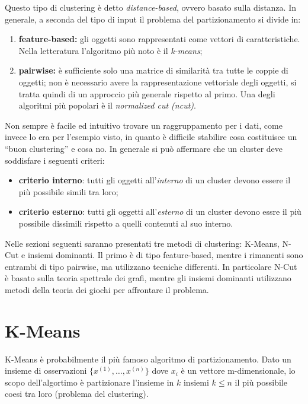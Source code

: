 \newpage

Questo tipo di clustering è detto \emph{distance-based}, ovvero basato sulla distanza. In generale, a seconda del tipo di input il problema del partizionamento si divide in:
\begin{enumerate}
	\item \textbf{feature-based:} gli oggetti sono rappresentati come vettori di caratteristiche. Nella letteratura l'algoritmo più noto è il \emph{k-means};
	\item \textbf{pairwise:} è sufficiente solo una matrice di similarità tra tutte le coppie di oggetti; non è necessario avere la rappresentazione vettoriale degli oggetti, si tratta quindi di un approccio più generale rispetto al primo. Una degli algoritmi più popolari è il \emph{normalized cut (ncut)}. 
\end{enumerate}

Non sempre è facile ed intuitivo trovare un raggruppamento per i dati, come invece lo era per l’esempio visto, in quanto è difficile stabilire cosa costituisce un “buon clustering” e cosa no. In generale si può affermare che un cluster deve soddisfare i seguenti criteri:
\begin{itemize}
	\item \textbf{criterio interno}: tutti gli oggetti all'\emph{interno} di un cluster devono essere il più possibile simili tra loro;
	\item \textbf{criterio esterno}: tutti gli oggetti all'\emph{esterno} di un cluster devono essre il più possibile dissimili rispetto a quelli contenuti al suo interno.
\end{itemize}

Nelle sezioni seguenti saranno presentati tre metodi di clustering:  K-Means, N-Cut e insiemi dominanti. Il primo è di tipo feature-based, mentre i rimanenti sono entrambi di tipo pairwise, ma utilizzano tecniche differenti. In particolare N-Cut è basato sulla teoria spettrale dei grafi, mentre gli insiemi dominanti utilizzano metodi della teoria dei giochi per affrontare il problema.

\newpage

\section{K-Means} %
\label{sec:k_means}
K-Means è probabilmente il più famoso algoritmo di partizionamento. Dato un insieme di osservazioni $\{x^{(1)},\dots,x^{(n)} \}$ dove $x_i$ è un vettore m-dimensionale, lo scopo dell'algortimo è partizionare l'insieme in $k$ insiemi $k \leq n$ il più possibile coesi tra loro (problema del clustering).\\


